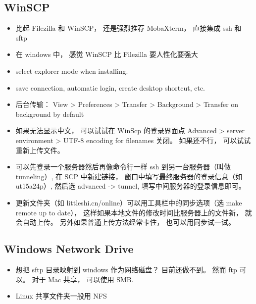\subsection{WinSCP}
\begin{itemize}
\item 比起 Filezilla 和 WinSCP， 还是强烈推荐 MobaXterm， 直接集成 ssh 和 sftp
\item 在 windows 中， 感觉 WinSCP 比 Filezilla 要人性化要强大
\item select explorer mode when installing.
\item save connection, automatic login, create desktop shortcut, etc.
\item 后台传输： View > Preferences > Transfer > Background > Transfer on background by default
\item 如果无法显示中文， 可以试试在 WinScp 的登录界面点 Advanced > server environment > UTF-8 encoding for filenames 关闭。 如果还不行， 可以试试重新上传文件。
\item 可以先登录一个服务器然后再像命令行一样 ssh 到另一台服务器（叫做 tunneling）, 在 SCP 中新建链接， 窗口中填写最终服务器的登录信息（如 ut15a24p）, 然后选 advanced -> tunnel, 填写中间服务器的登录信息即可。
\item 更新文件夹（如 littleshi.cn/online）可以用工具栏中的同步选项（选 make remote up to date）， 这样如果本地文件的修改时间比服务器上的文件新， 就会自动上传。 另外如果普通上传方法经常卡住， 也可以用同步试一试。
\end{itemize}

\subsection{Windows Network Drive}
\begin{itemize}
\item 想把 sftp 目录映射到 windows 作为网络磁盘？ 目前还做不到。 然而 ftp 可以。 对于 Mac 共享， 可以使用 SMB.
\item Linux 共享文件夹一般用 NFS
\end{itemize}
